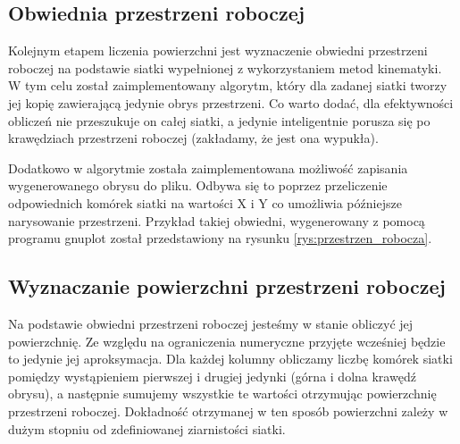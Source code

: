 \documentclass[printmode]{mgr}
\begin{document}
\subsection{Obwiednia przestrzeni roboczej}
Kolejnym etapem liczenia powierzchni jest wyznaczenie obwiedni przestrzeni roboczej na podstawie
siatki wypełnionej z wykorzystaniem metod kinematyki. W tym celu został zaimplementowany algorytm, 
który dla zadanej siatki tworzy jej kopię zawierającą jedynie obrys przestrzeni. Co warto dodać,
dla efektywności obliczeń nie przeszukuje on całej siatki, a jedynie inteligentnie porusza się
po krawędziach przestrzeni roboczej (zakładamy, że jest ona wypukła). 

Dodatkowo w algorytmie została zaimplementowana możliwość zapisania wygenerowanego obrysu do pliku. 
Odbywa się to poprzez przeliczenie odpowiednich komórek siatki na wartości X i Y co umożliwia
późniejsze narysowanie przestrzeni. Przykład takiej obwiedni, wygenerowany z pomocą programu gnuplot
został przedstawiony na rysunku \ref{rys:przestrzen_robocza}. 

\subsection{Wyznaczanie powierzchni przestrzeni roboczej} 
Na podstawie obwiedni przestrzeni roboczej jesteśmy w stanie obliczyć jej powierzchnię. 
Ze względu na ograniczenia numeryczne przyjęte wcześniej będzie to jedynie jej aproksymacja. 
Dla każdej kolumny obliczamy liczbę komórek siatki pomiędzy wystąpieniem pierwszej i drugiej jedynki
(górna i dolna krawędź obrysu), a następnie sumujemy wszystkie te wartości otrzymując powierzchnię przestrzeni
roboczej. Dokładność otrzymanej w ten sposób powierzchni zależy w dużym stopniu od zdefiniowanej
ziarnistości siatki. 
\end{document}
